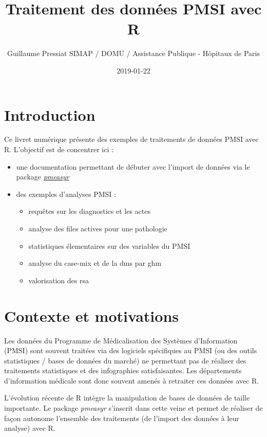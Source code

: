 \documentclass[]{book}
\title{Traitement des données PMSI avec R}
\author{Guillaume Pressiat \textbar{}\textbar{} SIMAP / DOMU / Assistance
Publique - Hôpitaux de Paris}
\date{2019-01-22}
\providecommand{\tightlist}{%
  \setlength{\itemsep}{0pt}\setlength{\parskip}{0pt}}
\begin{document}
\maketitle

{
\setcounter{tocdepth}{1}
\tableofcontents
}
\chapter{Introduction}\label{introduction}

Ce livret numérique présente des exemples de traitements de données PMSI
avec R. L'objectif est de concentrer ici :

\begin{itemize}
\item
  une documentation permettant de débuter avec l'import de données via
  le package \href{https://github.com/IM-APHP/pmeasyr}{\emph{pmeasyr}}
\item
  des exemples d'analyses PMSI :

  \begin{itemize}
  \tightlist
  \item
    requêtes sur les diagnostics et les actes
  \item
    analyse des files actives pour une pathologie
  \item
    statistiques élementaires sur des variables du PMSI
  \item
    analyse du case-mix et de la dms par ghm
  \item
    valorisation des rsa
  \end{itemize}
\end{itemize}

\chapter{Contexte et motivations}\label{contexte}

Les données du Programme de Médicalisation des Systèmes d'Information
(PMSI) sont souvent traitées via des logiciels spécifiques au PMSI (ou
des outils statistiques / bases de données du marché) ne permettant pas
de réaliser des traitements statistiques et des infographies
satisfaisantes. Les départements d'information médicale sont donc
souvent amenés à retraiter ces données avec R.

L'évolution récente de R intègre la manipulation de bases de données de
taille importante. Le package \emph{pmeasyr} s'inscrit dans cette veine
et permet de réaliser de façon autonome l'ensemble des traitements (de
l'import des données à leur analyse) avec R.
\end{document}
